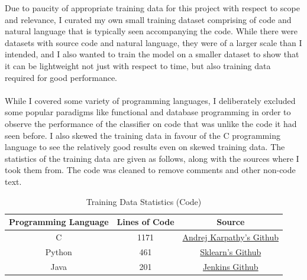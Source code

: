 \documentclass[12pt]{scrreprt}
\begin{document}
Due to paucity of appropriate training data for this project with respect to scope and relevance, I curated my own small training dataset comprising of code and natural language that is typically seen accompanying the code. While there were datasets with source code and natural language, they were of a larger scale than I intended, and I also wanted to train the model on a smaller dataset to show that it can be lightweight not just with respect to time, but also training data required for good performance.\\ 
\\ While I covered some variety of programming languages, I deliberately excluded some popular paradigms like functional and database programming in order to observe the performance of the classifier on code that was unlike the code it had seen before.  I also skewed the training data in favour of the C programming language to see the relatively good results even on skewed training data. The statistics of the training data are given as follows, along with the sources where I took them from. The code was cleaned to remove comments and other non-code text.



\begin{table}[h]
    \centering
    \begin{tabular}{|c|c|c|}
        \hline
        \textbf{Programming Language} & \textbf{Lines of Code} & Source \\
        \hline
        C & 1171 & \href{https://github.com/karpathy/llm.c/blob/master/train_gpt2.c}{Andrej Karpathy's Github} \\
        \hline
        Python & 461 & \href{https://github.com/scikit-learn/scikit-learn/blob/main/sklearn/covariance/_robust_covariance.py}{Sklearn's Github} \\
        \hline
        Java & 201 & \href{https://github.com/jenkinsci/jenkins/tree/master}{Jenkins Github} \\
        \hline
    \end{tabular}
    \caption{Training Data Statistics (Code)}
    \label{tab:training-data}
\end{table}
\end{document}
